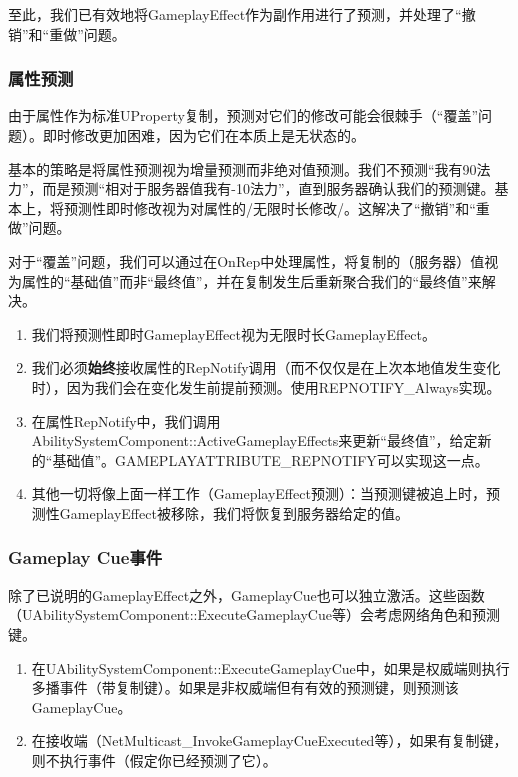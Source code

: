 \documentclass[10pt,CJKmath]{ctexart}
\begin{document}
至此，我们已有效地将GameplayEffect作为副作用进行了预测，并处理了“撤销”和“重做”问题。

\subsubsection{属性预测}
由于属性作为标准UProperty复制，预测对它们的修改可能会很棘手（“覆盖”问题）。即时修改更加困难，因为它们在本质上是无状态的。

基本的策略是将属性预测视为增量预测而非绝对值预测。我们不预测“我有90法力”，而是预测“相对于服务器值我有-10法力”，直到服务器确认我们的预测键。基本上，将预测性即时修改视为对属性的/无限时长修改/。这解决了“撤销”和“重做”问题。

对于“覆盖”问题，我们可以通过在OnRep中处理属性，将复制的（服务器）值视为属性的“基础值”而非“最终值”，并在复制发生后重新聚合我们的“最终值”来解决。

\begin{enumerate}
	\item 我们将预测性即时GameplayEffect视为无限时长GameplayEffect。
	\item 我们必须\textbf{始终}接收属性的RepNotify调用（而不仅仅是在上次本地值发生变化时），因为我们会在变化发生前提前预测。使用REPNOTIFY\_Always实现。
	\item 在属性RepNotify中，我们调用AbilitySystemComponent::ActiveGameplayEffects来更新“最终值”，给定新的“基础值”。GAMEPLAYATTRIBUTE\_REPNOTIFY可以实现这一点。
	\item 其他一切将像上面一样工作（GameplayEffect预测）：当预测键被追上时，预测性GameplayEffect被移除，我们将恢复到服务器给定的值。
\end{enumerate}

\subsubsection{Gameplay Cue事件}
除了已说明的GameplayEffect之外，GameplayCue也可以独立激活。这些函数（UAbilitySystemComponent::ExecuteGameplayCue等）会考虑网络角色和预测键。

\begin{enumerate}
	\item 在UAbilitySystemComponent::ExecuteGameplayCue中，如果是权威端则执行多播事件（带复制键）。如果是非权威端但有有效的预测键，则预测该GameplayCue。
	\item 在接收端（NetMulticast\_InvokeGameplayCueExecuted等），如果有复制键，则不执行事件（假定你已经预测了它）。
\end{enumerate}
\end{document}
